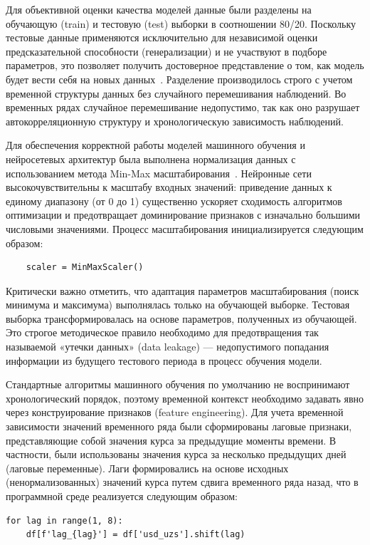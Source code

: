 Для объективной оценки качества моделей данные были разделены на обучающую (train) и тестовую (test) выборки в соотношении 80/20. Поскольку тестовые данные применяются исключительно для независимой оценки предсказательной способности (генерализации) и не участвуют в подборе параметров, это позволяет получить достоверное представление о том, как модель будет вести себя на новых данных~\cite{verbeek2008}. Разделение производилось строго с учетом временной структуры данных без случайного перемешивания наблюдений. Во временных рядах случайное перемешивание недопустимо, так как оно разрушает автокорреляционную структуру и хронологическую зависимость наблюдений.

Для обеспечения корректной работы моделей машинного обучения и нейросетевых архитектур была выполнена нормализация данных с использованием метода Min-Max масштабирования~\cite{james2021}. Нейронные сети высокочувствительны к масштабу входных значений: приведение данных к единому диапазону (от 0 до 1) существенно ускоряет сходимость алгоритмов оптимизации и предотвращает доминирование признаков с изначально большими числовыми значениями.
Процесс масштабирования инициализируется следующим образом:
\begin{lstlisting}
    scaler = MinMaxScaler()
\end{lstlisting}

Критически важно отметить, что адаптация параметров масштабирования (поиск минимума и максимума) выполнялась только на обучающей выборке. Тестовая выборка трансформировалась на основе параметров, полученных из обучающей. Это строгое методическое правило необходимо для предотвращения так называемой «утечки данных» (data leakage) — недопустимого попадания информации из будущего тестового периода в процесс обучения модели.

Стандартные алгоритмы машинного обучения по умолчанию не воспринимают хронологический порядок, поэтому временной контекст необходимо задавать явно через конструирование признаков (feature engineering). Для учета временной зависимости значений временного ряда были сформированы лаговые признаки, представляющие собой значения курса за предыдущие моменты времени. В частности, были использованы значения курса за несколько предыдущих дней (лаговые переменные).
Лаги формировались на основе исходных (ненормализованных) значений курса путем сдвига временного ряда назад, что в программной среде реализуется следующим образом:
\begin{lstlisting}
for lag in range(1, 8):
    df[f'lag_{lag}'] = df['usd_uzs'].shift(lag)
\end{lstlisting}

